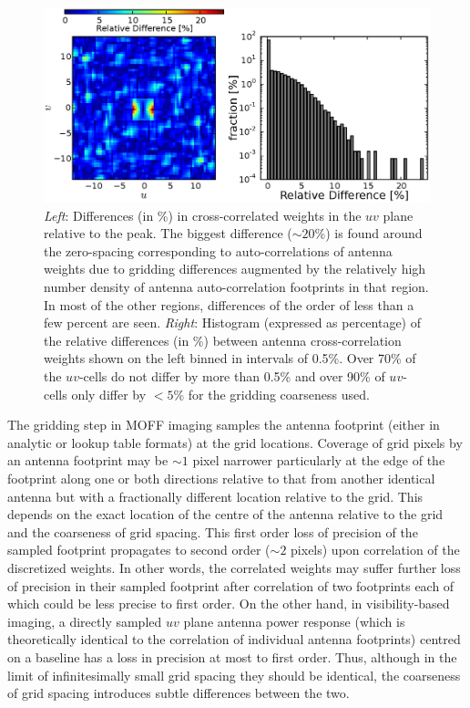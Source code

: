 \documentclass[a4paper,fleqn,usenatbib]{mnras}
\begin{document}
\begin{figure}
  \includegraphics[width=\columnwidth]{figure7}
  \caption{{\it Left}: Differences (in \%) in cross-correlated weights in the $uv$ plane relative to the peak. The biggest difference ($\sim 20$\%) is found around the zero-spacing corresponding to auto-correlations of antenna weights due to gridding differences augmented by the relatively high number density of antenna auto-correlation footprints in that region. In most of the other regions, differences of the order of less than a few percent are seen. {\it Right}: Histogram (expressed as percentage) of the relative differences (in \%) between antenna cross-correlation weights shown on the left binned in intervals of 0.5\%. Over 70\% of the $uv$-cells do not differ by more than 0.5\% and over 90\% of $uv$-cells only differ by $<5$\% for the gridding coarseness used.} 
  \label{fig:MOFF-FX-uvwts-diff}
\end{figure}

The gridding step in MOFF imaging samples the antenna footprint (either in analytic or lookup table formats) at the grid locations. Coverage of grid pixels by an antenna footprint may be $\sim 1$ pixel narrower particularly at the edge of the footprint along one or both directions relative to that from another identical antenna but with a fractionally different location relative to the grid. This depends on the exact location of the centre of the antenna relative to the grid and the coarseness of grid spacing. This first order loss of precision of the sampled footprint propagates to second order ($\sim 2$ pixels) upon correlation of the discretized weights. In other words, the correlated weights may suffer further loss of precision in their sampled footprint after correlation of two footprints each of which could be less precise to first order. On the other hand, in visibility-based imaging, a directly sampled $uv$ plane antenna power response (which is theoretically identical to the correlation of individual antenna footprints) centred on a baseline has a loss in precision at most to first order. Thus, although in the limit of infinitesimally small grid spacing they should be identical, the coarseness of grid spacing introduces subtle differences between the two.
\end{document}
